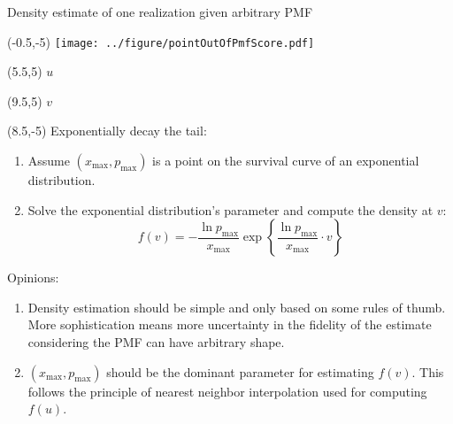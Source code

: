 \documentclass[aspectratio=169]{beamer}
\begin{document}
\begin{frame}{Density estimate of one realization given arbitrary PMF}

\begin{textblock}{1}(-0.5,-5)
\texttt{[image: ../figure/pointOutOfPmfScore.pdf]}
\end{textblock}


\begin{textblock}{1}(5.5,5)
\small$u$
\end{textblock}

\begin{textblock}{1}(9.5,5)
\small$v$
\end{textblock}


\begin{textblock}{6.25}(8.5,-5)
\tiny Exponentially decay the tail:\smallskip

\begin{enumerate}
\tiny\item Assume $\left(x_{\max},p_{\max}\right)$ is a point on the survival curve of an exponential distribution.\smallskip

\tiny\item Solve the exponential distribution's parameter and compute the density at $v$: \begin{equation*}
f(v)=-\frac{\ln p_{\max}}{x_{\max}}\exp\left\{ \frac{\ln p_{\max}}{x_{\max}}\cdot v \right\}
\end{equation*} 
\end{enumerate}
\tiny Opinions:\smallskip

\begin{enumerate}
\tiny\item Density estimation should be simple and only based on some rules of thumb. More sophistication means more uncertainty in the fidelity of the estimate considering the PMF can have arbitrary shape.   
\smallskip

\tiny\item $\left(x_{\max},p_{\max}\right)$ should be the dominant parameter for estimating $f(v)$. This follows the principle of nearest neighbor interpolation used for computing $f(u)$.\medskip

\end{enumerate}


\end{textblock}


\end{frame}







\end{document}
